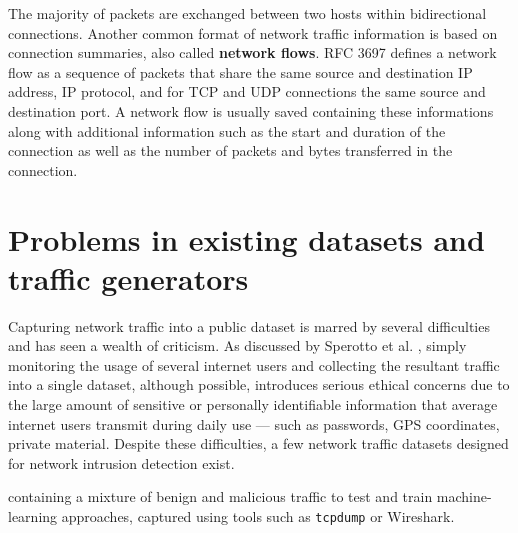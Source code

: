 \documentclass[sigconf,anonymous]{acmart}\usepackage[]{graphicx}\usepackage[]{color}
\begin{document}
The majority of packets are exchanged between two hosts within bidirectional connections. Another common format of network traffic information is based on connection summaries, also called \textbf{network flows}. RFC 3697 \cite{brownlee1999traffic} defines a network flow as a sequence of packets that share the same source and destination IP address, IP protocol, and for TCP and UDP connections the same source and destination port. A network flow is usually saved containing these informations along with additional information such as the start and duration of the connection as well as the number of packets and bytes transferred in the connection.


\section{Problems in existing datasets and traffic generators}

Capturing network traffic into a public dataset is marred by several difficulties and has seen a wealth of criticism. As discussed by Sperotto et al. \cite{sperotto2009labeled}, simply monitoring the usage of several internet users and collecting the resultant traffic into a single dataset, although possible, introduces serious ethical concerns due to the large amount of sensitive or personally identifiable information that average internet users transmit during daily use --- such as passwords, GPS coordinates, private material. Despite these difficulties, a few network traffic datasets  designed for network intrusion detection exist.

containing a mixture of benign and malicious traffic to test and train machine-learning approaches, captured using tools such as \texttt{tcpdump} or Wireshark. 

\end{document}
